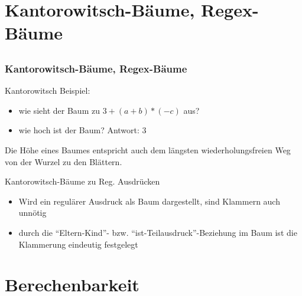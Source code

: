 \section[Bäume]{Kantorowitsch-Bäume, Regex-Bäume}

\subsection*{}
\begin{frame}
	\frametitle{Kantorowitsch-Bäume, Regex-Bäume}
	\begin{block}{Kantorowitsch}
	Beispiel: 
  	\begin{itemize}
        \item wie sieht der Baum zu $3+(a+b)*(-c)$ aus? \pause
        \item wie hoch ist der Baum? \pause Antwort: $3$
      \end{itemize} \pause
      Die Höhe eines Baumes entspricht auch dem längsten wiederholungsfreien
      Weg von der Wurzel zu den Blättern.
  	\end{block}

	\begin{block}{Kantorowitsch-Bäume zu Reg. Ausdrücken} \pause
	\begin{itemize}
        \item Wird ein regulärer Ausdruck als Baum dargestellt, sind Klammern auch
        unnötig \pause
        \item durch die "`Eltern-Kind"'- bzw. "`ist-Teilausdruck"'-Beziehung im
        Baum ist die Klammerung eindeutig festgelegt 
        \end{itemize}
  	\end{block}
\end{frame}






\section{Berechenbarkeit}
